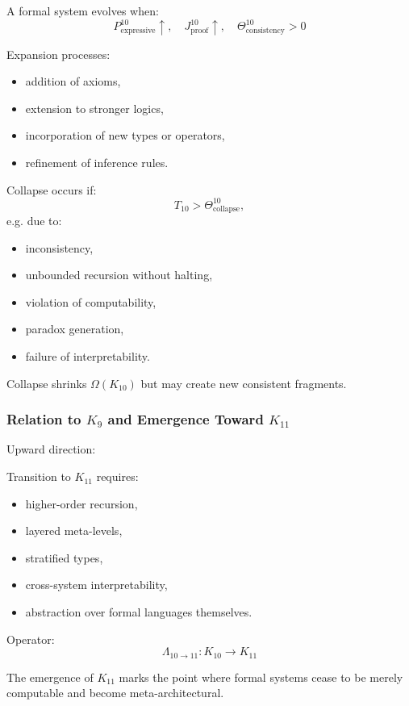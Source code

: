 A formal system evolves when:
\[
P^{10}_{\text{expressive}} \uparrow,
\quad
J^{10}_{\text{proof}} \uparrow,
\quad
\Theta^{10}_{\text{consistency}} > 0
\]

Expansion processes:
\begin{itemize}
    \item addition of axioms,
    \item extension to stronger logics,
    \item incorporation of new types or operators,
    \item refinement of inference rules.
\end{itemize}

Collapse occurs if:
\[
T_{10} > \Theta^{10}_{\text{collapse}},
\]
e.g. due to:
\begin{itemize}
    \item inconsistency,
    \item unbounded recursion without halting,
    \item violation of computability,
    \item paradox generation,
    \item failure of interpretability.
\end{itemize}

Collapse shrinks $\Omega(K_{10})$ but may create new consistent fragments.

\subsubsection{Relation to $K_{9}$ and Emergence Toward $K_{11}$}

Upward direction:

Transition to $K_{11}$ requires:
\begin{itemize}
    \item higher-order recursion,
    \item layered meta-levels,
    \item stratified types,
    \item cross-system interpretability,
    \item abstraction over formal languages themselves.
\end{itemize}

Operator:
\[
\Lambda_{10 \to 11}: K_{10} \to K_{11}
\]

The emergence of $K_{11}$ marks the point where
formal systems cease to be merely computable
and become meta-architectural.

